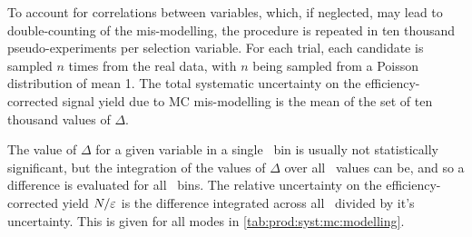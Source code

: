 To account for correlations between variables, which, if neglected, may lead to
double-counting of the mis-modelling, the procedure is repeated in ten thousand
pseudo-experiments per selection variable.
For each trial, each candidate is sampled $n$ times from the real data, with
$n$ being sampled from a Poisson distribution of mean 1.
The total systematic uncertainty on the efficiency-corrected signal yield due
to \ac{MC} mis-modelling is the mean of the set of ten thousand values of
$\Delta$.

The value of $\Delta$ for a given variable in a single \pTy\ bin is usually not
statistically significant, but the integration of the values of $\Delta$ over
all \pTy\ values can be, and so a difference is evaluated for all \pTy\ bins.
The relative uncertainty on the efficiency-corrected yield $N/\varepsilon$ is the
difference integrated across all \pTy\ divided by it's uncertainty.
This is given for all modes in \cref{tab:prod:syst:mc:modelling}.

